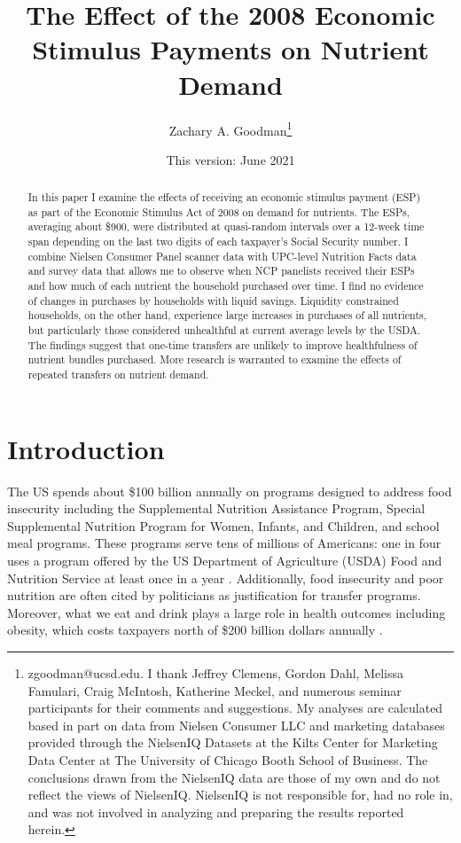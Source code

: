 \documentclass[12pt]{article}
\title{The Effect of the 2008 Economic Stimulus Payments on Nutrient Demand}
\author{Zachary A. Goodman\thanks{zgoodman@ucsd.edu.
I thank Jeffrey Clemens, Gordon Dahl, Melissa Famulari, Craig McIntosh, Katherine Meckel, and numerous seminar participants for their comments and suggestions.
My analyses are calculated based in part on data from Nielsen Consumer LLC and marketing databases provided through the NielsenIQ Datasets at the Kilts Center for Marketing Data Center at The University of Chicago Booth School of Business.
The conclusions drawn from the NielsenIQ data are those of my own and do not reflect the views of NielsenIQ.
NielsenIQ is not responsible for, had no role in, and was not involved in analyzing and preparing the results reported herein.}}
\affil{University of California, San Diego}
\date{This version: June 2021}
\begin{document}
\maketitle

\begin{abstract}
In this paper I examine the effects of receiving an economic stimulus payment (ESP) as part of the Economic Stimulus Act of 2008 on demand for nutrients. The ESPs, averaging about \$900, were distributed at quasi-random intervals over a 12-week time span depending on the last two digits of each taxpayer's Social Security number. I combine Nielsen Consumer Panel scanner data with UPC-level Nutrition Facts data and survey data that allows me to observe when NCP panelists received their ESPs and how much of each nutrient the household purchased over time. I find no evidence of changes in purchases by households with liquid savings. Liquidity constrained households, on the other hand, experience large increases in purchases of all nutrients, but particularly those considered unhealthful at current average levels by the USDA. The findings suggest that one-time transfers are unlikely to improve healthfulness of nutrient bundles purchased. More research is warranted to examine the effects of repeated transfers on nutrient demand.
\end{abstract}

\pagebreak

\doublespacing

\section{Introduction} \label{introduction}

The US spends about \$100 billion annually on programs designed to address food insecurity including the Supplemental Nutrition Assistance Program, Special Supplemental Nutrition Program for Women, Infants, and Children, and school meal programs.
These programs serve tens of millions of Americans: one in four uses a program offered by the US Department of Agriculture (USDA) Food and Nutrition Service at least once in a year \parencite{usdafns}.
Additionally, food insecurity and poor nutrition are often cited by politicians as justification for transfer programs.
Moreover, what we eat and drink plays a large role in health outcomes including obesity, which costs taxpayers north of \$200 billion dollars annually \parencite{cawley2012medical}.
\end{document}
